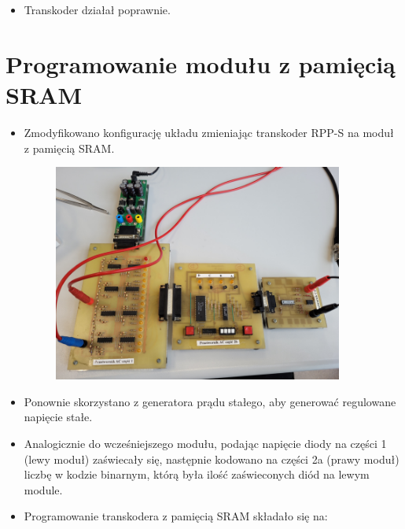 \begin{itemize}
\begin{figure}[H]
\begin{subfigure}[H]{0.45\textwidth}
                \caption*{U = 10V}
            \end{subfigure}
        \end{figure}
        Wraz ze wzrostem napięcia wejściowego na układ sygnał wyjściowy przypominał bardziej sygnał wejściowy.
        \item Transkoder działał poprawnie.
\end{itemize} 

\section{Programowanie modułu z pamięcią SRAM}


\begin{itemize}
    \item Zmodyfikowano konfigurację układu zmieniając transkoder RPP-S na moduł z pamięcią SRAM.
        \begin{figure}[H]
            \centering
            \includegraphics[width=0.9\textwidth]{img/3/20220608_113651_scaled.png}
        \end{figure}
    \item Ponownie skorzystano z generatora prądu stałego, aby generować regulowane napięcie stałe.
    \item Analogicznie do wcześniejszego modułu, podając napięcie diody na części 1 (lewy moduł) zaświecały się, następnie kodowano na części 2a (prawy moduł) liczbę w kodzie binarnym, którą była ilość zaświeconych diód na lewym module.
    \item Programowanie transkodera z pamięcią SRAM składało się na:
        \begin{enumerate}

\end{enumerate}
\end{itemize}
